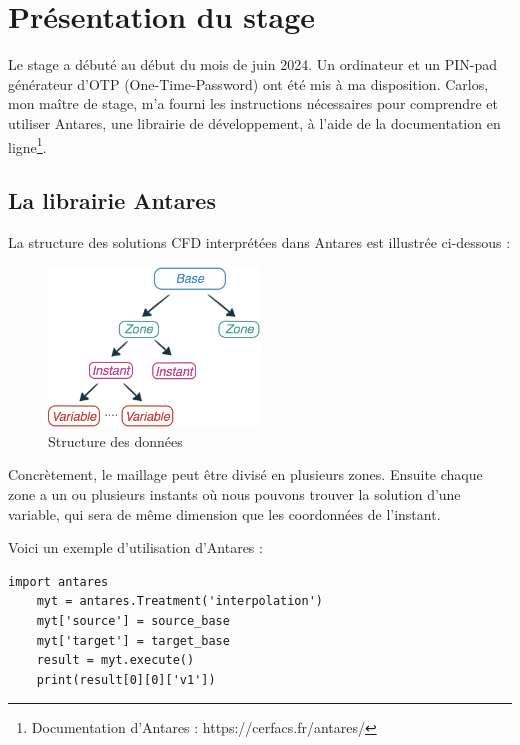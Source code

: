 \chapter{Présentation du stage}

Le stage a débuté au début du mois de juin 2024. Un ordinateur et un PIN-pad générateur d'OTP (One-Time-Password) ont été mis à ma disposition. Carlos, mon maître de stage, m'a fourni les instructions nécessaires pour comprendre et utiliser Antares\cite{antares}, une librairie de développement, à l'aide de la documentation en ligne\footnote{Documentation d'Antares : https://cerfacs.fr/antares/}.

\section{La librairie Antares}

La structure des solutions CFD interprétées dans Antares est illustrée ci-dessous :

\begin{figure}[ht!]
\centering
\includegraphics[width=0.5\textwidth]{images/data_structure_1.png}
\caption{Structure des données}
\end{figure}

Concrètement, le maillage peut être divisé en plusieurs zones.
Ensuite chaque zone a un ou plusieurs instants où nous pouvons trouver la solution d'une variable, qui sera de même dimension que les coordonnées de l'instant.

Voici un exemple d'utilisation d'Antares :

\begin{lstlisting}[caption=Exemple simple d'utilisation d'Antares pour interpoler, label={lst:antares}]
    import antares
    myt = antares.Treatment('interpolation')
    myt['source'] = source_base
    myt['target'] = target_base
    result = myt.execute()
    print(result[0][0]['v1'])
\end{lstlisting}

